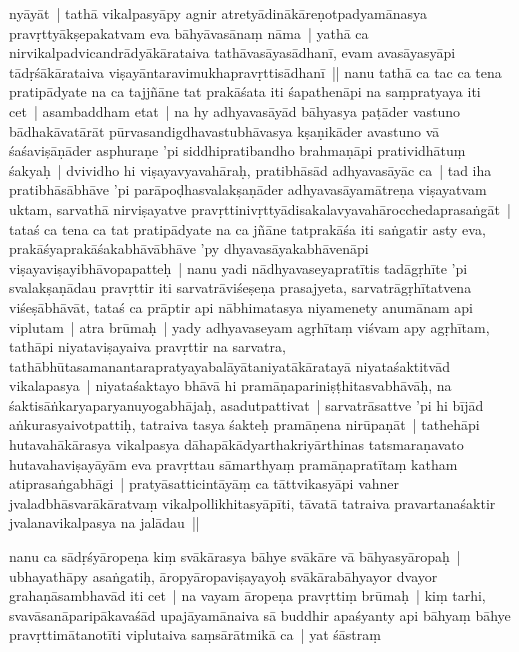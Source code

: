 \documentclass[article,a4paper]{memoir}
\begin{document}
	  \pstart nyā\-yā\-t | tathā\- vikalpasyā\-py agnir atretyā\-dinā\-kā\-reṇotpadyamā\-nasya pravṛttyā\-kṣepakatvam eva bā\-hyā\-vasā\-naṃ nā\-ma | yathā\- ca nirvikalpadvicandrā\-dyā\-kā\-rataiva tathā\-vasā\-yasā\-dhanī\-, evam avasā\-yasyā\-pi tā\-dṛśā\-kā\-rataiva viṣayā\-ntaravimukhapravṛttisā\-dhanī\- || \label{thakur75-137.25} nanu tathā\- ca tac ca tena pratipā\-dyate na ca tajjñā\-ne tat prakā\-śata iti śapathenā\-pi na saṃpratyaya iti cet | asambaddham etat | na hy adhyavasā\-yā\-d bā\-hyasya paṭā\-der vastuno bā\-dhakā\-vatā\-rā\-t pū\-rvasandigdhavastubhā\-vasya kṣaṇikā\-der avastuno vā\- śaśaviṣā\-ṇā\-der asphuraṇe 'pi siddhipratibandho brahmaṇā\-pi pratividhā\-tuṃ śakyaḥ | dvividho hi viṣayavyavahā\-raḥ, pratibhā\-sā\-d adhyavasā\-yā\-c ca | tad iha pratibhā\-sā\-bhā\-ve 'pi parā\-poḍhasvalakṣaṇā\-der adhyavasā\-yamā\-treṇa viṣayatvam uktam, sarvathā\- nirviṣayatve pravṛttinivṛttyā\-disakalavyavahā\-rocchedaprasaṅgā\-t | tataś ca tena ca tat pratipā\-dyate na ca jñā\-ne tatprakā\-śa iti saṅgatir asty eva, prakā\-śyaprakā\-śakabhā\-vā\-bhā\-ve 'py dhyavasā\-yakabhā\-venā\-pi viṣayaviṣayibhā\-vopapatteḥ | \label{thakur75-138.1} nanu yadi nā\-dhyavaseyapratī\-tis tadā\-gṛhī\-te 'pi svalakṣaṇā\-dau pravṛttir iti sarvatrā\-viśeṣeṇa prasajyeta, sarvatrā\-gṛhī\-tatvena viśeṣā\-bhā\-vā\-t, tataś ca prā\-ptir api nā\-bhimatasya niyamenety anumā\-nam api viplutam | atra brū\-maḥ | yady adhyavaseyam agṛhī\-taṃ viśvam apy agṛhī\-tam, tathā\-pi niyataviṣayaiva pravṛttir na sarvatra, tathā\-bhū\-tasamanantarapratyayabalā\-yā\-taniyatā\-kā\-ratayā\- niyataśaktitvā\-d vikalapasya | niyataśaktayo bhā\-vā\- hi pramā\-ṇapariniṣṭhitasvabhā\-vā\-ḥ, na śaktisā\-ṅkaryaparyanuyogabhā\-jaḥ, asadutpattivat | sarvatrā\-sattve 'pi hi bī\-jā\-d aṅkurasyaivotpattiḥ, tatraiva tasya śakteḥ pramā\-ṇena nirū\-paṇā\-t | tathehā\-pi hutavahā\-kā\-rasya vikalpasya dā\-hapā\-kā\-dyarthakriyā\-rthinas tatsmaraṇavato hutavahaviṣayā\-yā\-m eva pravṛttau sā\-marthyaṃ pramā\-ṇapratī\-taṃ katham atiprasaṅgabhā\-gi | pratyā\-satticintā\-yā\-ṃ ca tā\-ttvikasyā\-pi vahner jvaladbhā\-svarā\-kā\-\label{capv-np-13a-start}ratvaṃ vikalpollikhitasyā\-pī\-ti, tā\-vatā\- tatraiva pravartanaśaktir jvalanavikalpasya na jalā\-dau ||
	\pend
      

	  \pstart nanu ca sā\-dṛśyā\-ropeṇa kiṃ svā\-kā\-rasya bā\-hye svā\-kā\-re vā\- bā\-hyasyā\-ropaḥ | ubhayathā\-py asaṅgatiḥ, ā\-ropyā\-ropaviṣayayoḥ svā\-kā\-rabā\-hyayor dvayor grahaṇā\-sambhavā\-d iti cet | na vayam ā\-ropeṇa pravṛttiṃ brū\-maḥ | kiṃ tarhi, svavā\-sanā\-paripā\-kavaśā\-d upajā\-yamā\-naiva sā\- buddhir apaśyanty api bā\-hyaṃ bā\-hye pravṛttimā\-tanotī\-ti viplutaiva saṃsā\-rā\-tmikā\- ca | yat śā\-straṃ 
	\pend
      
\end{document}
